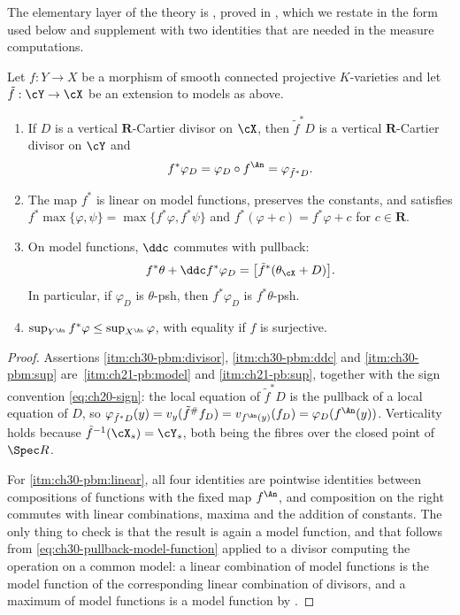 The elementary layer of the theory is , proved in
, which we restate in the form used below and supplement
with two identities that are needed in the measure computations.

\begin{lemma}
\label{lem:ch30-pullback-model-calculus}
Let \(f:Y\to X\) be a morphism of smooth connected projective
\(K\)-varieties and let \(\tilde f:\cY\to\cX\) be an extension to models as
above.
\begin{enumerate}
\item\label{itm:ch30-pbm:divisor}
If \(D\) is a vertical \(\mathbf R\)-Cartier divisor on \(\cX\), then
\(\tilde f^*D\) is a vertical \(\mathbf R\)-Cartier divisor on \(\cY\) and
\begin{equation}
\label{eq:ch30-pullback-model-function}
              f^*\varphi_D=\varphi_D\circ f^{\An}=\varphi_{\tilde f^*D}.
\end{equation}
\item\label{itm:ch30-pbm:linear}
The map \(f^*\) is linear on model functions, preserves the constants, and
satisfies \(f^*\max\{\varphi,\psi\}=\max\{f^*\varphi,f^*\psi\}\) and
\(f^*(\varphi+c)=f^*\varphi+c\) for \(c\in\mathbf R\).
\item\label{itm:ch30-pbm:ddc}
On model functions, \(\ddc\) commutes with pullback:
\begin{equation}
\label{eq:ch30-pullback-ddc}
     f^*\theta+\ddc f^*\varphi_D=\bigl[\tilde f^*(\theta_{\cX}+D)\bigr].
\end{equation}
In particular, if \(\varphi_D\) is \(\theta\)-psh, then \(f^*\varphi_D\) is
\(f^*\theta\)-psh.
\item\label{itm:ch30-pbm:sup}
\(\sup_{Y^{\An}}f^*\varphi\leq\sup_{X^{\An}}\varphi\), with equality if
\(f\) is surjective.
\end{enumerate}
\end{lemma}

\begin{proof}
Assertions \cref{itm:ch30-pbm:divisor}, \cref{itm:ch30-pbm:ddc} and
\cref{itm:ch30-pbm:sup} are
\,\cref{itm:ch21-pb:model} and
\cref{itm:ch21-pb:sup}, together with the sign convention
\eqref{eq:ch20-sign}: the local equation of \(\tilde f^*D\) is the pullback
of a local equation of \(D\), so
\(\varphi_{\tilde f^*D}(y)=v_y(\tilde f^\#f_D)=v_{f^{\An}(y)}(f_D)
=\varphi_D(f^{\An}(y))\).  Verticality holds because
\(\tilde f^{-1}(\cX_s)=\cY_s\), both being the fibres over the closed point
of \(\Spec R\).

For \cref{itm:ch30-pbm:linear}, all four identities are pointwise identities
between compositions of functions with the fixed map \(f^{\An}\), and
composition on the right commutes with linear combinations, maxima and the
addition of constants.  The only thing to check is that the result is again
a model function, and that follows from \eqref{eq:ch30-pullback-model-function}
applied to a divisor computing the operation on a common model: a linear
combination of model functions is the model function of the corresponding
linear combination of divisors, and a maximum of model functions is a model
function by .
\end{proof}

